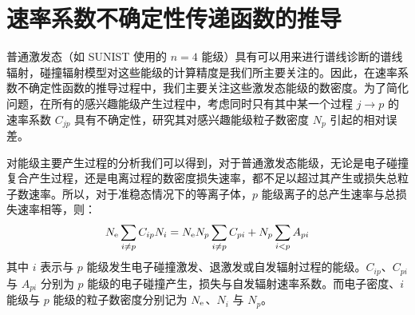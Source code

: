 \graphicspath{{figures/appendix-error-propgate/}}

\chapter{速率系数不确定性传递函数的推导}
\label{appendix:error-propagate}

普通激发态（如 SUNIST 使用的 $n=4$ 能级）具有可以用来进行谱线诊断的谱线辐射，碰撞辐射模型对这些能级的计算精度是我们所主要关注的。因此，在速率系数不确定性函数的推导过程中，我们主要关注这些激发态能级的数密度。为了简化问题，在所有的感兴趣能级产生过程中，考虑同时只有其中某一个过程 $j\to p$ 的速率系数 $C_{jp}$ 具有不确定性\cite{Andrew2000PPCFSensitivity}，研究其对感兴趣能级粒子数密度 $N_p$ 引起的相对误差。

对能级主要产生过程的分析我们可以得到，对于普通激发态能级，无论是电子碰撞复合产生过程，还是电离过程的数密度损失速率，都不足以超过其产生或损失总粒子数速率。所以，对于准稳态情况下的等离子体，$p$ 能级离子的总产生速率与总损失速率相等，则：
\begin{equation}
N_{\rm e}\sum_{i\ne p}C_{ip}N_i=N_{\rm e}N_p\sum_{i\ne p}C_{pi}+N_p\sum_{i<p}A_{pi}
\label{eq:appendix:error:rateequation}
\end{equation}
其中 $i$ 表示与 $p$ 能级发生电子碰撞激发、退激发或自发辐射过程的能级。$C_{ip}$、$C_{pi}$ 与 $A_{pi}$ 分别为 $p$ 能级的电子碰撞产生，损失与自发辐射速率系数。而电子密度、$i$ 能级与 $p$ 能级的粒子数密度分别记为 $N_{\rm e}$、$N_i$ 与 $N_p$。

